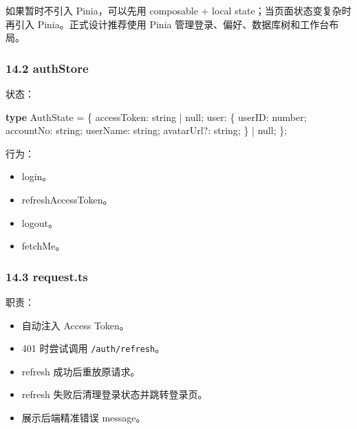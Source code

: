 \documentclass[
  a4paper,
  UTF8]{ctexart}
\newenvironment{Shaded}{}{}
\newcommand{\DataTypeTok}[1]{\textcolor[rgb]{0.56,0.13,0.00}{#1}}
\newcommand{\KeywordTok}[1]{\textcolor[rgb]{0.00,0.44,0.13}{\textbf{#1}}}
\newcommand{\NormalTok}[1]{#1}
\newcommand{\OperatorTok}[1]{\textcolor[rgb]{0.40,0.40,0.40}{#1}}
\providecommand{\tightlist}{%
  \setlength{\itemsep}{0pt}\setlength{\parskip}{0pt}}
\begin{document}
如果暂时不引入 Pinia，可以先用 composable + local
state；当页面状态变复杂时再引入 Pinia。正式设计推荐使用 Pinia
管理登录、偏好、数据库树和工作台布局。

\hypertarget{authstore}{%
\subsubsection{14.2 authStore}\label{authstore}}

状态：

\begin{Shaded}
\begin{Highlighting}[]
\KeywordTok{type}\NormalTok{ AuthState }\OperatorTok{=}\NormalTok{ \{}
\NormalTok{  accessToken}\OperatorTok{:} \DataTypeTok{string} \OperatorTok{|} \DataTypeTok{null}\OperatorTok{;}
\NormalTok{  user}\OperatorTok{:}\NormalTok{ \{}
\NormalTok{    userID}\OperatorTok{:} \DataTypeTok{number}\OperatorTok{;}
\NormalTok{    accountNo}\OperatorTok{:} \DataTypeTok{string}\OperatorTok{;}
\NormalTok{    userName}\OperatorTok{:} \DataTypeTok{string}\OperatorTok{;}
\NormalTok{    avatarUrl}\OperatorTok{?:} \DataTypeTok{string}\OperatorTok{;}
\NormalTok{  \} }\OperatorTok{|}\NormalTok{ null}\OperatorTok{;}
\NormalTok{\}}\OperatorTok{;}
\end{Highlighting}
\end{Shaded}

行为：

\begin{itemize}
\tightlist
\item
  login。
\item
  refreshAccessToken。
\item
  logout。
\item
  fetchMe。
\end{itemize}

\hypertarget{request.ts}{%
\subsubsection{14.3 request.ts}\label{request.ts}}

职责：

\begin{itemize}
\tightlist
\item
  自动注入 Access Token。
\item
  401 时尝试调用 \texttt{/auth/refresh}。
\item
  refresh 成功后重放原请求。
\item
  refresh 失败后清理登录状态并跳转登录页。
\item
  展示后端精准错误 message。
\end{itemize}
\end{document}
